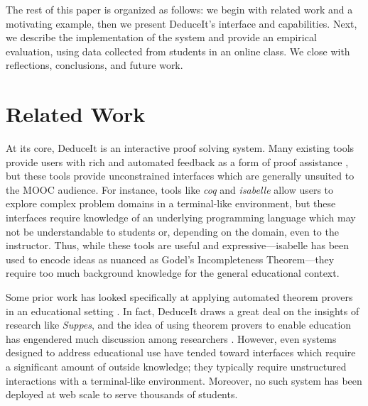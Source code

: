 \documentclass{sigchi}
\begin{document}
The rest of this paper is organized as follows: we begin with related work and a motivating example, then we present DeduceIt's interface and capabilities. Next, we describe the implementation of the system and provide an empirical evaluation, using data collected from students in an online class. We close with reflections, conclusions, and future work.

\section{Related Work}
At its core, DeduceIt is an interactive proof solving system. Many existing tools provide users with rich and automated feedback as a form of proof assistance \cite{coq,maude,isabelle, isabelle1,lisp-logic}, but these tools provide unconstrained interfaces which are generally unsuited to the MOOC audience. For instance, tools like \textit{coq} and \textit{isabelle} allow users to explore complex problem domains in a terminal-like environment, but these interfaces require knowledge of an underlying programming language which may not be understandable to students or, depending on the domain, even to the instructor. Thus, while these tools are useful and expressive---isabelle has been used to encode ideas as nuanced as Godel's Incompleteness Theorem---they require too much background knowledge for the general educational context.

Some prior work has looked specifically at applying automated theorem provers in an educational setting \cite{suppes, suppes-prover}. In fact, DeduceIt draws a great deal on the insights of research like \textit{Suppes}, and the idea of using theorem provers to enable education has engendered much discussion among researchers \cite{automated-grading, automated-scoring-design}. However, even systems designed to address educational use have tended toward interfaces which require a significant amount of outside knowledge; they typically require unstructured interactions with a terminal-like environment. Moreover, no such system has been deployed at web scale to serve thousands of students.
\end{document}
